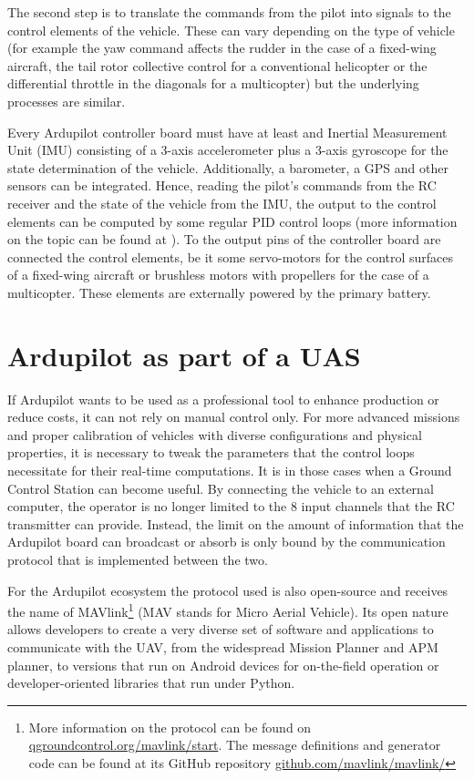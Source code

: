 The second step is to translate the commands from the pilot into signals to the control elements of the vehicle.
These can vary depending on the type of vehicle (for example the yaw command affects the rudder in the case of a fixed-wing aircraft, the tail rotor collective control for a conventional helicopter or the differential throttle in the diagonals for a multicopter) but the underlying processes are similar.

Every Ardupilot controller board must have at least and Inertial Measurement Unit (IMU) consisting of a 3-axis accelerometer plus a 3-axis gyroscope for the state determination of the vehicle.
Additionally, a barometer, a GPS and other sensors can be integrated.
Hence, reading the pilot's commands from the RC receiver and the state of the vehicle from the IMU, the output to the control elements can be computed by some regular PID control loops (more information on the topic can be found at \cite{ogata2010}).
To the output pins of the controller board are connected the control elements, be it some servo-motors for the control surfaces of a fixed-wing aircraft or brushless motors with propellers for the case of a multicopter.
These elements are externally powered by the primary battery.

\section{Ardupilot as part of a UAS}

If Ardupilot wants to be used as a professional tool to enhance production or reduce costs, it can not rely on manual control only. 
For more advanced missions and proper calibration of vehicles with diverse configurations and physical properties, it is necessary to tweak the parameters that the control loops necessitate for their real-time computations.
It is in those cases when a Ground Control Station can become useful.
By connecting the vehicle to an external computer, the operator is no longer limited to the 8 input channels that the RC transmitter can provide.
Instead, the limit on the amount of information that the Ardupilot board can broadcast or absorb is only bound by the communication protocol that is implemented between the two.

For the Ardupilot ecosystem the protocol used is also open-source and receives the name of MAVlink\footnote{More information on the protocol can be found on \url{qgroundcontrol.org/mavlink/start}. The message definitions and generator code can be found at its GitHub repository \url{github.com/mavlink/mavlink/}} (MAV stands for Micro Aerial Vehicle).
Its open nature allows developers to create a very diverse set of software and applications to communicate with the UAV, from the widespread Mission Planner and APM planner, to versions that run on Android devices for on-the-field operation or developer-oriented libraries that run under Python.

